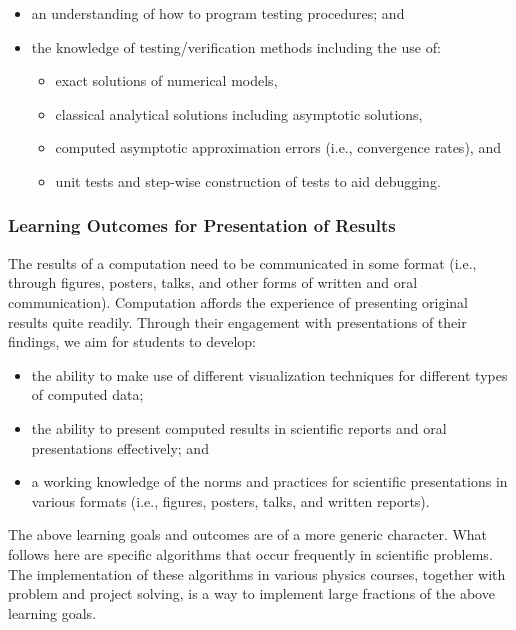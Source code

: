 \documentclass[graybox,envcountchap,sectrefs]{svmult}
\begin{document}
\begin{itemize}
\item an understanding of how to program testing procedures; and

\item the knowledge of testing/verification methods including the use of:
\begin{itemize}

  \item exact solutions of numerical models,

  \item classical analytical solutions including asymptotic solutions,

  \item computed asymptotic approximation errors (i.e., convergence rates), and

  \item unit tests and step-wise construction of tests to aid debugging.
\end{itemize}


\end{itemize}


\subsubsection{Learning Outcomes for Presentation of Results}
The results of a computation need to be communicated in some format (i.e., through figures, posters, talks, and other forms of written and oral communication). Computation affords the experience of presenting original results quite readily. Through their engagement with presentations of their findings, we aim for students to develop:

\begin{itemize}
\item the ability to make use of different visualization techniques for different types of computed data;

\item the ability to present computed results in scientific reports and oral presentations effectively; and

\item a working knowledge of the norms and practices for scientific presentations in various formats (i.e., figures, posters, talks, and written reports).
\end{itemize}


The above learning goals and outcomes are of a more generic character. What follows here are specific
algorithms that occur frequently in scientific problems. The implementation of these algorithms in various physics courses, together with problem and project solving, is a way to implement large fractions of the above learning goals.
\end{document}
